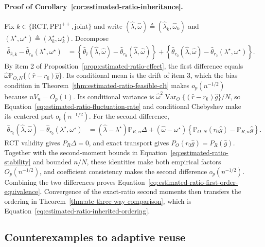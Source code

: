 \paragraph{Proof of Corollary~\ref{cor:estimated-ratio-inheritance}.}
Fix $k\in\{\mathrm{RCT},\mathrm{PPI}^{++},\mathrm{joint}\}$ and write $(\widehat\lambda,\widehat\omega)\triangleq(\widehat\lambda_k,\widehat\omega_k)$ and $(\lambda^\star,\omega^\star)\triangleq(\lambda_k^\star,\omega_k^\star)$. Decompose
\begin{align*}
\widehat\theta_{\widehat r,k}-\widehat\theta_{r_0}(\lambda^\star,\omega^\star)
&=\left\{\widehat\theta_{\widehat r}(\widehat\lambda,\widehat\omega)-\widehat\theta_{r_0}(\widehat\lambda,\widehat\omega)\right\}
+\left\{\widehat\theta_{r_0}(\widehat\lambda,\widehat\omega)-\widehat\theta_{r_0}(\lambda^\star,\omega^\star)\right\}.
\end{align*}
By item 2 of Proposition~\ref{prop:estimated-ratio-effect}, the first difference equals $\widehat\omega\mathbb P_{O,N}\{(\widehat r-r_0)\widehat g\}$. Its conditional mean is the drift of item 3, which the bias condition in Theorem~\ref{thm:estimated-ratio-feasible-clt} makes $o_p(n^{-1/2})$ because $nV_n=O_p(1)$. Its conditional variance is $\widehat\omega^2\operatorname{Var}_O\{(\widehat r-r_0)\widehat g\}/N$, so Equation~\eqref{eq:estimated-ratio-fluctuation-rate} and conditional Chebyshev make its centered part $o_p(n^{-1/2})$. For the second difference,
\begin{align*}
\widehat\theta_{r_0}(\widehat\lambda,\widehat\omega)-\widehat\theta_{r_0}(\lambda^\star,\omega^\star)
&=(\widehat\lambda-\lambda^\star)\mathbb P_{R,n}\Delta
+(\widehat\omega-\omega^\star)\left\{\mathbb P_{O,N}(r_0\widehat g)-\mathbb P_{R,n}\widehat g\right\}.
\end{align*}
RCT validity gives $P_R\Delta=0$, and exact transport gives $P_O(r_0\widehat g)=P_R(\widehat g)$. Together with the second-moment bounds in Equation~\eqref{eq:estimated-ratio-stability} and bounded $n/N$, these identities make both empirical factors $O_p(n^{-1/2})$, and coefficient consistency makes the second difference $o_p(n^{-1/2})$. Combining the two differences proves Equation~\eqref{eq:estimated-ratio-first-order-equivalence}. Convergence of the exact-ratio second moments then transfers the ordering in Theorem~\ref{thm:ate-three-way-comparison}, which is Equation~\eqref{eq:estimated-ratio-inherited-ordering}.

\subsection{Counterexamples to adaptive reuse}

